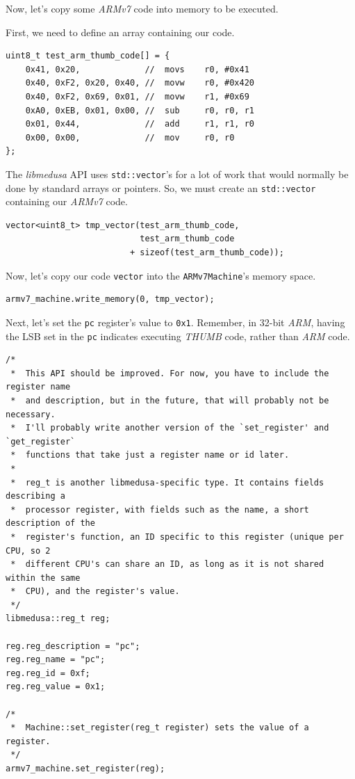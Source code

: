 \documentclass{article}
\begin{document}
	Now, let's copy some \textit{ARMv7} code into memory to be executed.

	First, we need to define an array containing our code.

	\begin{lstlisting}
uint8_t test_arm_thumb_code[] = {
	0x41, 0x20,				//	movs	r0,	#0x41
	0x40, 0xF2, 0x20, 0x40,	//	movw	r0,	#0x420
	0x40, 0xF2, 0x69, 0x01,	//	movw	r1,	#0x69
	0xA0, 0xEB, 0x01, 0x00,	//	sub		r0,	r0,	r1
	0x01, 0x44,				//	add		r1,	r1,	r0
	0x00, 0x00,				//  mov		r0,	r0
};
	\end{lstlisting}

	The \textit{libmedusa} API uses \texttt{std::vector}'s for a lot of work
	that would normally be done by standard arrays or pointers. So, we must
	create an \texttt{std::vector} containing our \textit{ARMv7} code.

	\begin{lstlisting}
vector<uint8_t> tmp_vector(test_arm_thumb_code,
						   test_arm_thumb_code
						 + sizeof(test_arm_thumb_code));
	\end{lstlisting}

	Now, let's copy our code \texttt{vector} into the \texttt{ARMv7Machine}'s
	memory space.

	\begin{lstlisting}
armv7_machine.write_memory(0, tmp_vector);
	\end{lstlisting}

	Next, let's set the \texttt{pc} register's value to \texttt{0x1}. Remember,
	in 32-bit \textit{ARM}, having the LSB set in the \texttt{pc} indicates
	executing \textit{THUMB} code, rather than \textit{ARM} code.

	\begin{lstlisting}
/*
 *  This API should be improved. For now, you have to include the register name
 *  and description, but in the future, that will probably not be necessary.
 *  I'll probably write another version of the `set_register' and `get_register`
 *  functions that take just a register name or id later.
 *
 *  reg_t is another libmedusa-specific type. It contains fields describing a
 *  processor register, with fields such as the name, a short description of the
 *  register's function, an ID specific to this register (unique per CPU, so 2
 *  different CPU's can share an ID, as long as it is not shared within the same
 *  CPU), and the register's value.
 */
libmedusa::reg_t reg;

reg.reg_description = "pc";
reg.reg_name = "pc";
reg.reg_id = 0xf;
reg.reg_value = 0x1;

/*
 *  Machine::set_register(reg_t register) sets the value of a register.
 */
armv7_machine.set_register(reg);
	\end{lstlisting}
\end{document}
